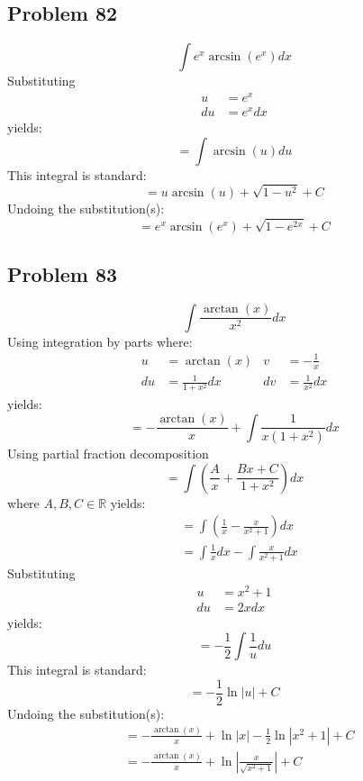\documentclass{article}
\begin{document}
\subsection*{Problem 82}
$$\int e^x\arcsin\left(e^x\right)dx$$
Substituting
\begin{align*}
u&=e^x \\
du&=e^xdx
\end{align*}
yields:
$$=\int\arcsin(u)du$$
This integral is standard:
$$=u\arcsin(u)+\sqrt{1-u^2}+C$$
Undoing the substitution(s):
$$=e^x\arcsin\left(e^x\right)+\sqrt{1-e^{2x}}+C$$
\subsection*{Problem 83}
$$\int\frac{\arctan\left(x\right)}{x^2}dx$$
Using integration by parts where:
\begin{align*}
u&=\arctan(x) &v&=-\frac{1}{x} \\
du&=\frac{1}{1+x^2}dx &dv&=\frac{1}{x^2}dx
\end{align*}
yields:
$$=-\frac{\arctan(x)}{x}+\int\frac{1}{x(1+x^2)}dx$$
Using partial fraction decomposition
$$=\int\left(\frac{A}{x}+\frac{Bx+C}{1+x^2}\right)dx$$
where $A,B,C\in\mathbb{R}$ yields:
\begin{align*}
&=\int\left(\frac{1}{x}-\frac{x}{x^2+1}\right)dx \\
&=\int\frac{1}{x}dx-\int\frac{x}{x^2+1}dx
\end{align*}
Substituting
\begin{align*}
u&=x^2+1 \\
du&=2xdx
\end{align*}
yields:
$$=-\frac{1}{2}\int\frac{1}{u}du$$
This integral is standard:
$$=-\frac{1}{2}\ln|u|+C$$
Undoing the substitution(s):
\begin{align*}
&=-\frac{\arctan(x)}{x}+\ln|x|-\frac{1}{2}\ln\left|x^2+1\right|+C \\
&=-\frac{\arctan(x)}{x}+\ln\left|\frac{x}{\sqrt{x^2+1}}\right|+C
\end{align*}
\end{document}
